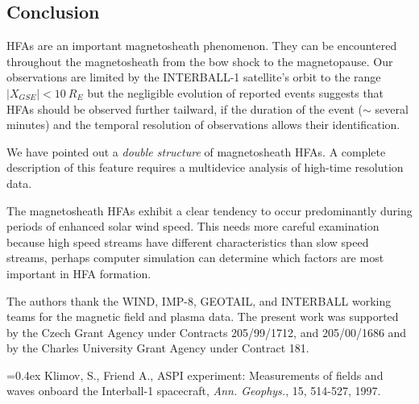 \documentclass[11pt]{article}
\begin{document}
\begin{article}
\section{Conclusion}
HFAs are an important magnetosheath phenomenon.
They can be encountered throughout the
magnetosheath from the bow shock to the magnetopause. Our
observations are limited by the INTERBALL-1 satellite's orbit to the
range $|X_{GSE}| < 10\> R_E$ but the negligible evolution of reported
events suggests that HFAs should be observed further tailward, if the
duration of the event ($\sim$ several minutes) and the temporal
resolution of observations allows their identification.

We have pointed out a {\it double structure} of magnetosheath
HFAs. A complete description of this feature requires a
multidevice analysis of high-time resolution data.

The magnetosheath HFAs exhibit a clear tendency to occur
predominantly during periods of enhanced solar wind speed.
This needs more careful examination because high speed streams
have different characteristics than slow speed streams,
perhaps computer simulation can determine which factors are
most important in HFA formation.

\acknowledgments %
{The authors thank the WIND, IMP-8, GEOTAIL, and INTERBALL working
teams for the
magnetic field and plasma data. The  present  work  was  supported by
the Czech  Grant  Agency  under  Contracts  205/99/1712, and
205/00/1686 and by the Charles University Grant Agency under
Contract 181.}



\begin{thebibliography}{}

\itemsep=0.4ex
{}
Klimov, S., Friend A., ASPI experiment: Measurements of fields and
waves onboard the Interball-1 spacecraft, {\it Ann. Geophys.}, 15,
514-527, 1997.


\end{thebibliography}
\end{article}
\end{document}
